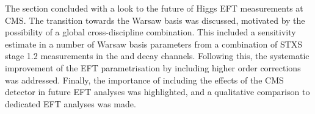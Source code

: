 The section concluded with a look to the future of Higgs EFT measurements at CMS. The transition towards the Warsaw basis was discussed, motivated by the possibility of a global cross-discipline combination. This included a sensitivity estimate in a number of Warsaw basis parameters from a combination of STXS stage 1.2 measurements in the \Hgg and \Hfl decay channels. Following this, the systematic improvement of the EFT parametrisation by including higher order corrections was addressed. Finally, the importance of including the effects of the CMS detector in future EFT analyses was highlighted, and a qualitative comparison to dedicated EFT analyses was made.